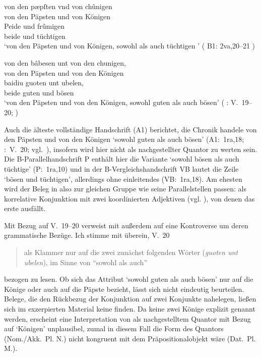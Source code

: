 \begin{exe}
\ex \begin{xlist}
	\ex \label{ex:kcexcl1}
		\gll von den pæpſten vnd von chûnigen \\
			von den Päpsten und von Königen \\
	\sn \gll Peide und frûmigen \\
			beide und tüchtigen \\
		\trans `von den Päpsten und von Königen, sowohl als auch tüchtigen
			'
			(%
				B1: 2va,20--21%
			)

	\ex \label{ex:kcexcl1_schroeder}
		\gll von den bâbesen unt von den chunigen, \\
			von den Päpsten und von den Königen \\
	\sn \gll baidiu guoten unt ubelen, \\
			beide guten und bösen \\
		\trans `von den Päpsten und von den Königen, sowohl guten als auch
			bösen'
			(%
				\KC: V.~19--20;
				\cite[79]{schroeder1895}%
			)
\end{xlist}
\end{exe}

Auch die älteste vollständige Handschrift (A1) berichtet, die Chronik handele
von den Päpsten und von den Königen  `sowohl guten
als auch bösen' (A1:~1ra,18; \KC:~V.~20; vgl.~\cite[79]{schroeder1895}),
insofern wird  hier nicht als nachgestellter Quantor zu werten
sein. Die B-\allowbreak{}Pa\-ral\-lel\-hand\-schrift P enthält hier die
Variante  `sowohl bösen als auch
tüchtige' (P:~1ra,10) und in der B-Vergleichshandschrift VB lautet
die Zeile  `bösen und tüchtigen', allerdings ohne
einleitendes  (VB:~1ra,18). Am ehesten wird der Beleg in
 also zur gleichen Gruppe wie seine Parallelstellen passen:
 als korrelative Konjunktion mit zwei koordinierten Adjektiven
(vgl. ), von denen das erste ausfällt.

Mit Bezug auf V.~19--20 verweist \citet[26, Anm.~45]{weis2022} mit \citet[55,
Anm.~87]{dickhutbielsky2015} außerdem auf eine Kontroverse um deren
grammatische Bezüge. Ich stimme mit \citet[239]{haupt2019} überein, V.~20
\blockquote{als Klammer nur auf die zwei zunächst folgenden Wörter
(\textit{guoten unt ubelen}), im Sinne von \enquote{sowohl als auch}} bezogen
zu lesen. Ob sich das Attribut  `sowohl guten als
auch bösen' nur auf die Könige oder auch auf die Päpste bezieht, lässt sich
nicht eindeutig beurteilen. Belege, die den Rückbezug der Konjunktion
 auf zwei Konjunkte nahelegen, ließen sich im exzerpierten Material
keine finden. Da keine zwei Könige explizit genannt werden, erscheint eine
Interpretation von  als nachgestelltem Quantor mit Bezug auf
 `Königen' unplausibel, zumal in diesem Fall die Form des
Quantors (Nom./Akk.~Pl. N.) nicht kongruent mit dem Präpositionalobjekt wäre
(Dat.~Pl. M.).

